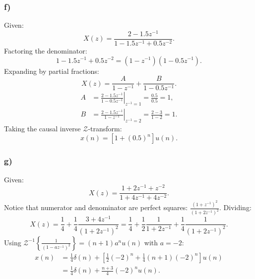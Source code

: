 \documentclass[12pt,a4paper]{article}
\begin{document}
\subsubsection*{f)}
Given:
\begin{equation}
    X(z) = \frac{2 - 1.5z^{-1}}{1 - 1.5z^{-1} + 0.5z^{-2}}.
\end{equation}
Factoring the denominator:
\begin{equation}
    1 - 1.5z^{-1} + 0.5z^{-2} = (1 - z^{-1})(1 - 0.5z^{-1}).
\end{equation}
Expanding by partial fractions:
\begin{equation}
    X(z) = \frac{A}{1 - z^{-1}} + \frac{B}{1 - 0.5z^{-1}}.
\end{equation}
\begin{align*}
    A &= \left. \frac{2 - 1.5z^{-1}}{1 - 0.5z^{-1}} \right|_{z^{-1} = 1} = \frac{0.5}{0.5} = 1, \\
    B &= \left. \frac{2 - 1.5z^{-1}}{1 - z^{-1}} \right|_{z^{-1} = 2} = \frac{2 - 3}{1 - 2} = 1.
\end{align*}
Taking the causal inverse $\mathcal{Z}$-transform:
\begin{equation}
    x(n) = \left[ 1 + (0.5)^n \right] u(n).
\end{equation}

\subsubsection*{g)}
Given:
\begin{equation}
    X(z) = \frac{1 + 2z^{-1} + z^{-2}}{1 + 4z^{-1} + 4z^{-2}}.
\end{equation}
Notice that numerator and denominator are perfect squares: $\frac{(1 + z^{-1})^2}{(1 + 2z^{-1})^2}$. Dividing:
\begin{equation}
    X(z) = \frac{1}{4} + \frac{1}{4} \frac{3 + 4z^{-1}}{(1 + 2z^{-1})^2} = \frac{1}{4} + \frac{1}{2} \frac{1}{1 + 2z^{-1}} + \frac{1}{4} \frac{1}{(1 + 2z^{-1})^2}.
\end{equation}
Using $\mathcal{Z}^{-1}\left\{ \frac{1}{(1 - a z^{-1})^2} \right\} = (n+1) a^n u(n)$ with $a = -2$:
\begin{align}
    x(n) &= \frac{1}{4}\delta(n) + \left[ \frac{1}{2}(-2)^n + \frac{1}{4}(n+1)(-2)^n \right] u(n) \nonumber \\
         &= \frac{1}{4}\delta(n) + \frac{n+3}{4}(-2)^n u(n).
\end{align}
\end{document}
